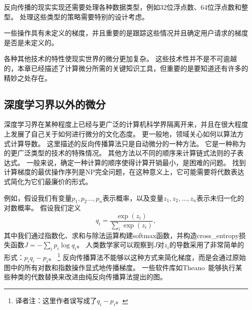 反向传播的现实实现还需要处理各种数据类型，例如32位浮点数、64位浮点数和整型。
处理这些类型的策略需要特别的设计考虑。

一些操作具有未定义的梯度，并且重要的是跟踪这些情况并且确定用户请求的梯度是否是未定义的。

各种其他技术的特性使现实世界的微分更加复杂。 这些技术性并不是不可逾越的，本章已经描述了计算微分所需的关键知识工具，但重要的是要知道还有许多的精妙之处存在。
  
  
\subsection{深度学习界以外的微分}
\label{sec:differentiation_outside_the_deep_learning_community}

深度学习界在某种程度上已经与更广泛的计算机科学界隔离开来，并且在很大程度上发展了自己关于如何进行微分的文化态度。
更一般地，领域关心如何以算法方式计算导数。 
这里描述的反向传播算法只是自动微分的一种方法。 
它是一种称为的更广泛类型的技术的特殊情况。 
其他方法以不同的顺序来计算链式法则的子表达式。 
一般来说，确定一种计算的顺序使得计算开销最小，是困难的问题。 
找到计算梯度的最优操作序列是NP完全问题\citep{Naumann-2008}，在这种意义上，它可能需要将代数表达式简化为它们最廉价的形式。

例如，假设我们有变量$p_1,p_2\ldots,p_n$表示概率，以及变量$z_1,z_2,\ldots,z_n$表示未归一化的对数概率。
假设我们定义
\begin{equation}
  q_i = \frac{\exp(z_i)}{\sum_i \exp(z_i)},
\end{equation}
其中我们通过指数化、求和与除法运算构建softmax函数，并构造\gls{cross_entropy}损失函数$J=-\sum_i p_i\log q_i$。
人类数学家可以观察到$J$对$z_i$的导数采用了非常简单的形式：$p_iq_i-p_i$。
\footnote{译者注：这里作者误写成了$q_i-p_i$。}
反向传播算法不能够以这种方式来简化梯度，而是会通过原始图中的所有对数和指数操作显式地传播梯度。
一些软件库如Theano~\citep{Bergstra-et-al-2010,Bastien-et-al-2012}能够执行某些种类的代数替换来改进由纯反向传播算法提出的图。
  
  
